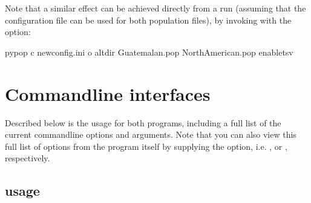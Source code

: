 \documentclass[letterpaper,10pt,english,openany,oneside]{sphinxmanual}
\begin{document}
\sphinxAtStartPar
Note that a similar effect can be achieved directly from a 
run (assuming that the configuration file can be used for both
 population files), by invoking  with the
 option:

\begin{sphinxVerbatim}[commandchars=\\\{\}]
pypop \PYGZhy{}c newconfig.ini \PYGZhy{}o altdir Guatemalan.pop NorthAmerican.pop \PYGZhy{}\PYGZhy{}enable\PYGZhy{}tsv
\end{sphinxVerbatim}


\section{Command\sphinxhyphen{}line interfaces}
\label{\detokenize{docs/guide-chapter-usage:command-line-interfaces}}
\sphinxAtStartPar
Described below is the usage for both programs, including a full list
of the current command\sphinxhyphen{}line options and arguments.  Note that you can
also view this full list of options from the program itself by
supplying the  option, i.e. , or , respectively.


\subsection{ usage}
\label{\detokenize{docs/guide-chapter-usage:pypop-usage}}\label{\detokenize{docs/guide-chapter-usage:guide-pypop-cli}}
\begin{sphinxVerbatim}[commandchars=\\\{\}]
  \PYG{p}{[}\PYG{p}{]} \PYG{p}{[} \PYG{p}{]} \PYG{p}{[}\PYG{p}{]} \PYG{p}{[} \PYG{p}{]} \PYG{p}{[}\PYG{p}{]} \PYG{p}{[}\PYG{p}{]} \PYG{p}{[} \PYG{p}{]} \PYG{p}{[}\PYG{p}{]} \PYG{p}{[}\PYG{p}{]} \PYG{p}{[}\PYG{p}{]} \PYG{p}{[}\PYG{p}{]} \PYG{p}{[} \PYG{p}{]}
             \PYG{p}{[} \PYG{p}{]}
\end{sphinxVerbatim}
\end{document}

